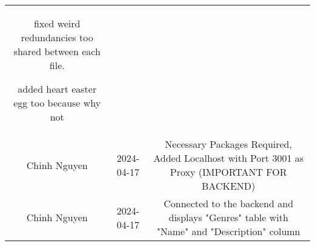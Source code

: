 \begin{tabular}{|c|c|c|}
fixed weird redundancies too shared between each file.

added heart easter egg too because why not \\
Chinh Nguyen & 2024-04-17 & Necessary Packages Required, Added Localhost with Port 3001 as Proxy (IMPORTANT FOR BACKEND) \\
Chinh Nguyen & 2024-04-17 & Connected to the backend and displays "Genres" table with "Name" and "Description" column \\
\hline
\end{tabular}